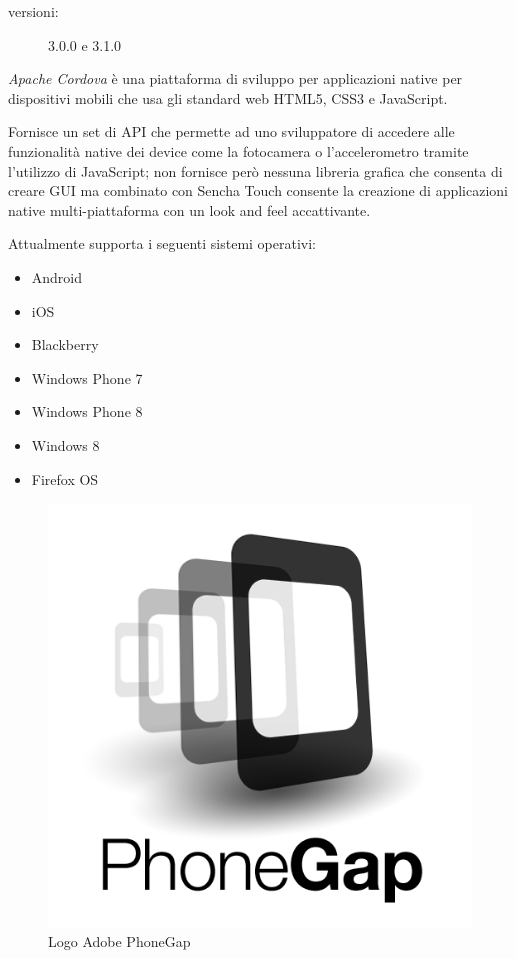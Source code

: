 \begin{description}
\item[versioni:] 3.0.0 e 3.1.0
\end{description}

\emph{Apache Cordova} è una piattaforma di sviluppo per applicazioni native per dispositivi mobili che usa gli standard web \acs{HTML5}, \acs{CSS3} e JavaScript.

Fornisce un set di \ac{API} che permette ad uno sviluppatore di accedere alle funzionalità native dei device come la fotocamera o l'accelerometro tramite l'utilizzo di JavaScript; non fornisce però nessuna libreria grafica che consenta di creare \ac{GUI} ma combinato con Sencha Touch consente la creazione di applicazioni native multi-piattaforma con un look and feel accattivante.

Attualmente supporta i seguenti sistemi operativi:
\begin{itemize}
\item Android
\item iOS
\item Blackberry
\item Windows Phone 7
\item Windows Phone 8
\item Windows 8
\item Firefox OS
\end{itemize}

\begin{figure}[htb]
\centering
\includegraphics[scale=0.25]{gfx/PhoneGap}
\caption{Logo Adobe PhoneGap}
\label{fig: logo phonegap}
\end{figure}

